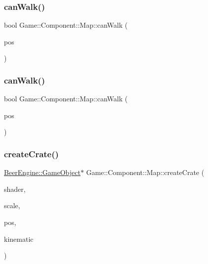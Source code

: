 \subsubsection{\texorpdfstring{can\+Walk()}{canWalk()}\hspace{0.1cm}{\footnotesize\ttfamily [1/2]}}
{\footnotesize\ttfamily bool Game\+::\+Component\+::\+Map\+::can\+Walk (\begin{DoxyParamCaption}\item[{glm\+::vec2}]{pos }\end{DoxyParamCaption})}

\mbox{\label{class_game_1_1_component_1_1_map_a7a6621502aa66db7afdb6c63494c6790}} 
\subsubsection{\texorpdfstring{can\+Walk()}{canWalk()}\hspace{0.1cm}{\footnotesize\ttfamily [2/2]}}
{\footnotesize\ttfamily bool Game\+::\+Component\+::\+Map\+::can\+Walk (\begin{DoxyParamCaption}\item[{glm\+::vec3}]{pos }\end{DoxyParamCaption})}

\mbox{\label{class_game_1_1_component_1_1_map_a9630a4fd7c1ba8e2d463bb4f8f1ce4e9}} 
\subsubsection{\texorpdfstring{create\+Crate()}{createCrate()}}
{\footnotesize\ttfamily \mbox{\hyperlink{class_beer_engine_1_1_game_object}{Beer\+Engine\+::\+Game\+Object}}$\ast$ Game\+::\+Component\+::\+Map\+::create\+Crate (\begin{DoxyParamCaption}\item[{\mbox{\hyperlink{class_beer_engine_1_1_graphics_1_1_shader_program}{Beer\+Engine\+::\+Graphics\+::\+Shader\+Program}} $\ast$}]{shader,  }\item[{glm\+::vec3}]{scale,  }\item[{glm\+::vec3}]{pos,  }\item[{\mbox{\hyperlink{namespace_beer_engine_1_1_component_a2cfe279cc309b6420e792597940b8a33}{Beer\+Engine\+::\+Component\+::\+R\+B\+Type}}}]{kinematic }\end{DoxyParamCaption})}

